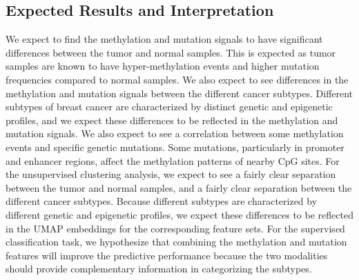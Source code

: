 \documentclass[11pt]{article}
\begin{document}
\subsection*{Expected Results and Interpretation}
We expect to find the methylation and mutation signals to have significant differences between the tumor and normal samples. This is expected as tumor samples are known
to have hyper-methylation events and higher mutation frequencies compared to normal samples.
We also expect to see differences in the methylation and mutation signals between the different cancer subtypes.
Different subtypes of breast cancer are characterized by distinct genetic and 
epigenetic profiles, and we expect these differences to be reflected in the methylation and mutation signals.
We also expect to see a correlation between some methylation events and specific genetic mutations. Some mutations, particularly in promoter and enhancer regions, 
affect the methylation patterns of nearby CpG sites.
For the unsupervised clustering analysis, we expect to see a fairly 
clear separation between the tumor and normal samples, and a fairly 
clear separation between the different cancer subtypes. 
Because different subtypes are characterized by different 
genetic and epigenetic profiles, we expect these differences to be
reflected in the UMAP embeddings for the corresponding feature sets. 
For the supervised classification task, we hypothesize that combining
the methylation and mutation features will improve the predictive performance
because the two modalities should provide complementary information in categorizing
the subtypes.
\end{document}
